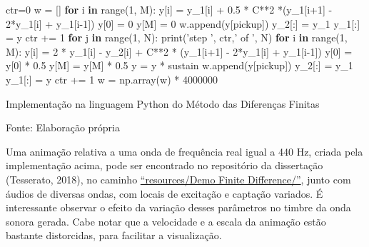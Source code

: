\documentclass[]{article}
\newenvironment{Shaded}{}{}
\newcommand{\BuiltInTok}[1]{#1}
\newcommand{\ControlFlowTok}[1]{\textcolor[rgb]{0.00,0.44,0.13}{\textbf{#1}}}
\newcommand{\DecValTok}[1]{\textcolor[rgb]{0.25,0.63,0.44}{#1}}
\newcommand{\FloatTok}[1]{\textcolor[rgb]{0.25,0.63,0.44}{#1}}
\newcommand{\KeywordTok}[1]{\textcolor[rgb]{0.00,0.44,0.13}{\textbf{#1}}}
\newcommand{\NormalTok}[1]{#1}
\newcommand{\OperatorTok}[1]{\textcolor[rgb]{0.40,0.40,0.40}{#1}}
\newcommand{\StringTok}[1]{\textcolor[rgb]{0.25,0.44,0.63}{#1}}
\begin{document}
\begin{Shaded}
\begin{Highlighting}[numbers=left,,]
\NormalTok{ctr}\OperatorTok{=}\DecValTok{0}
\NormalTok{w }\OperatorTok{=}\NormalTok{ []}
\ControlFlowTok{for}\NormalTok{ i }\KeywordTok{in} \BuiltInTok{range}\NormalTok{(}\DecValTok{1}\NormalTok{, M):}
\NormalTok{  y[i] }\OperatorTok{=}\NormalTok{ y_1[i] }\OperatorTok{+} \FloatTok{0.5} \OperatorTok{*}\NormalTok{ C}\OperatorTok{**}\DecValTok{2} \OperatorTok{*}\NormalTok{(y_1[i}\OperatorTok{+}\DecValTok{1}\NormalTok{] }\OperatorTok{-} \DecValTok{2}\OperatorTok{*}\NormalTok{y_1[i] }\OperatorTok{+}\NormalTok{ y_1[i}\DecValTok{-1}\NormalTok{])}
\NormalTok{y[}\DecValTok{0}\NormalTok{] }\OperatorTok{=} \DecValTok{0}
\NormalTok{y[M] }\OperatorTok{=} \DecValTok{0}
\NormalTok{w.append(y[pickup])}
\NormalTok{y_2[:] }\OperatorTok{=}\NormalTok{ y_1}
\NormalTok{y_1[:] }\OperatorTok{=}\NormalTok{ y}
\NormalTok{ctr }\OperatorTok{+=} \DecValTok{1}
\ControlFlowTok{for}\NormalTok{ j }\KeywordTok{in} \BuiltInTok{range}\NormalTok{(}\DecValTok{1}\NormalTok{, N):}
  \BuiltInTok{print}\NormalTok{(}\StringTok{'step '}\NormalTok{, ctr,}\StringTok{' of '}\NormalTok{, N)}
  \ControlFlowTok{for}\NormalTok{ i }\KeywordTok{in} \BuiltInTok{range}\NormalTok{(}\DecValTok{1}\NormalTok{, M):}
\NormalTok{    y[i] }\OperatorTok{=} \DecValTok{2} \OperatorTok{*}\NormalTok{ y_1[i] }\OperatorTok{-}\NormalTok{ y_2[i] }\OperatorTok{+}\NormalTok{ C}\OperatorTok{**}\DecValTok{2} \OperatorTok{*}\NormalTok{ (y_1[i}\OperatorTok{+}\DecValTok{1}\NormalTok{] }\OperatorTok{-} \DecValTok{2}\OperatorTok{*}\NormalTok{y_1[i] }\OperatorTok{+}\NormalTok{ y_1[i}\DecValTok{-1}\NormalTok{])}
\NormalTok{  y[}\DecValTok{0}\NormalTok{] }\OperatorTok{=}\NormalTok{ y[}\DecValTok{0}\NormalTok{] }\OperatorTok{*} \FloatTok{0.5}
\NormalTok{  y[M] }\OperatorTok{=}\NormalTok{ y[M] }\OperatorTok{*} \FloatTok{0.5}
\NormalTok{  y }\OperatorTok{=}\NormalTok{ y }\OperatorTok{*}\NormalTok{ sustain}
\NormalTok{  w.append(y[pickup])}
\NormalTok{  y_2[:] }\OperatorTok{=}\NormalTok{ y_1 }
\NormalTok{  y_1[:] }\OperatorTok{=}\NormalTok{ y}
\NormalTok{  ctr }\OperatorTok{+=} \DecValTok{1}
\NormalTok{w }\OperatorTok{=}\NormalTok{ np.array(w) }\OperatorTok{*} \DecValTok{4000000}
\end{Highlighting}
\end{Shaded}

Implementação na linguagem Python do Método das Diferenças Finitas

Fonte: Elaboração própria

Uma animação relativa a uma onda de frequência real igual a 440 Hz,
criada pela implementação acima, pode ser encontrado no repositório da
dissertação (Tesserato, 2018), no caminho
\href{https://github.com/tesserato/tesserato.github.io/tree/master/resources/Demo\%20Finite\%20Difference}{``resources/Demo
Finite Difference/''}, junto com áudios de diversas ondas, com locais de
excitação e captação variados. É interessante observar o efeito da
variação desses parâmetros no timbre da onda sonora gerada. Cabe notar
que a velocidade e a escala da animação estão bastante distorcidas, para
facilitar a visualização.
\end{document}
